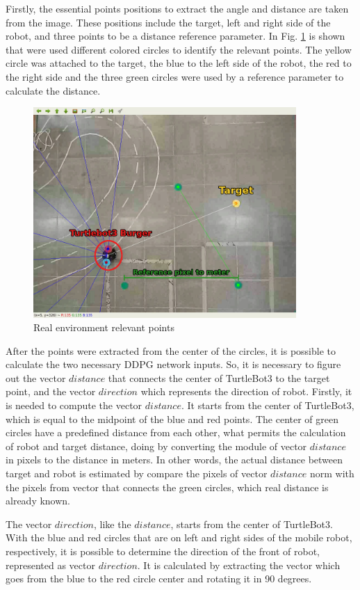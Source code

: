 Firstly, the essential points positions to extract the angle and distance are taken from the image.
These positions include the target, left and right side of the robot, and three points to be a distance reference parameter.
In Fig. \ref{fig:pixel_to_meter} is shown that were used different colored circles to identify the relevant points.
The yellow circle was attached to the target, the blue to the left side of the robot, the red to the right side and the three green circles were used by a reference parameter to calculate the distance.

\begin{figure}[H]
\centerline{\includegraphics[width=10cm]{images/pixel_to_meter.png}}
\caption{Real environment relevant points}
\label{fig:pixel_to_meter}
\end{figure}


After the points were extracted from the center of the circles, it is possible to calculate the two necessary DDPG network inputs.
So, it is necessary to figure out the vector $distance$ that connects the center of TurtleBot3 to the target point, and the vector $direction$ which represents the direction of robot.
Firstly, it is needed to compute the vector $distance$.
It starts from the center of TurtleBot3, which is equal to the midpoint of the blue and red points.
The center of green circles have a predefined distance from each other, what permits the calculation of robot and target distance, doing by converting the module of vector $distance$ in pixels to the distance in meters.
In other words, the actual distance between target and robot is estimated by compare the pixels of vector $distance$ norm with the pixels from vector that connects the green circles, which real distance is already known. 

The vector $direction$, like the $distance$, starts from the center of TurtleBot3.
With the blue and red circles that are on left and right sides of the mobile robot, respectively, it is possible to determine the direction of the front of robot, represented as vector $direction$.
It is calculated by extracting the vector which goes from the blue to the red circle center and rotating it in 90 degrees.



